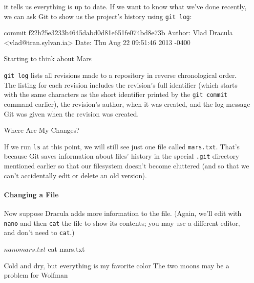 \documentclass{book}
\begin{document}
it tells us everything is up to date. If we want to know what we've done
recently, we can ask Git to show us the project's history using
\texttt{git log}:


\begin{VerbOut}
commit f22b25e3233b4645dabd0d81e651fe074bd8e73b
Author: Vlad Dracula <vlad@tran.sylvan.ia>
Date:   Thu Aug 22 09:51:46 2013 -0400

    Starting to think about Mars
\end{VerbOut}

\texttt{git log} lists all revisions made to a repository in reverse
chronological order. The listing for each revision includes the
revision's full identifier (which starts with the same characters as the
short identifier printed by the \texttt{git commit} command earlier),
the revision's author, when it was created, and the log message Git was
given when the revision was created.

\begin{swcbox}{Where Are My Changes?}

If we run \texttt{ls} at this point, we will still see just one file
called \texttt{mars.txt}. That's because Git saves information about
files' history in the special \texttt{.git} directory mentioned earlier
so that our filesystem doesn't become cluttered (and so that we can't
accidentally edit or delete an old version).

\end{swcbox}

\mbox{}\paragraph{Changing a File}

Now suppose Dracula adds more information to the file. (Again, we'll
edit with \texttt{nano} and then \texttt{cat} the file to show its
contents; you may use a different editor, and don't need to
\texttt{cat}.)

\begin{VerbIn}
$ nano mars.txt
$ cat mars.txt
\end{VerbIn}

\begin{VerbOut}
Cold and dry, but everything is my favorite color
The two moons may be a problem for Wolfman
\end{VerbOut}
\end{document}

